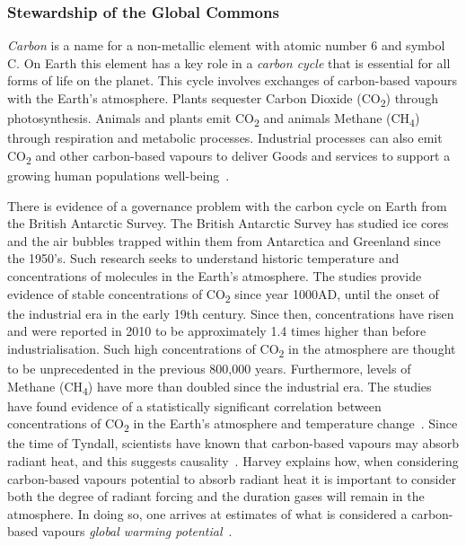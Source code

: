 \documentclass[11pt, oneside]{book}   	%
\begin{document}
\subsubsection{Stewardship of the Global Commons}
\emph{Carbon} is a name for a non-metallic element with atomic number 6 and symbol C.
On Earth this element has a key role in a \emph{carbon cycle} that is essential for all forms of life on the planet.
This cycle involves exchanges of carbon-based vapours with the Earth's atmosphere.
Plants sequester Carbon Dioxide (CO\textsubscript{2}) through photosynthesis.
Animals and plants emit CO\textsubscript{2} and animals Methane (CH\textsubscript{4}) through respiration and metabolic processes.
Industrial processes can also emit CO\textsubscript{2} and other carbon-based vapours to deliver Goods and services to support a growing human populations well-being~\cite{ng1}.\

There is evidence of a governance problem with the carbon cycle on Earth from the British Antarctic Survey.
The British Antarctic Survey has studied ice cores and the air bubbles trapped within them from Antarctica and Greenland since the 1950’s.
Such research seeks to understand historic temperature and concentrations of molecules in the Earth’s atmosphere.
The studies provide evidence of stable concentrations of CO\textsubscript{2} since year 1000AD, until the onset of the industrial era in the early 19th century.
Since then, concentrations have risen and were reported in 2010 to be approximately 1.4 times higher than before industrialisation.
Such high concentrations of CO\textsubscript{2} in the atmosphere are thought to be unprecedented in the previous 800,000 years. Furthermore, levels of Methane (CH\textsubscript{4}) have more than doubled since the industrial era.
The studies have found evidence of a statistically significant correlation between concentrations of CO\textsubscript{2} in the Earth’s atmosphere and temperature change~\cite{ba1}.
Since the time of Tyndall, scientists have known that carbon-based vapours may absorb radiant heat, and this suggests causality~\cite{td1}.
Harvey explains how, when considering carbon-based vapours potential to absorb radiant heat it is important to consider both the degree of radiant forcing and the duration gases will remain in the atmosphere.
In doing so, one arrives at estimates of what is considered a carbon-based vapours \emph{global warming potential}~\cite{dldh1}.\
\end{document}
